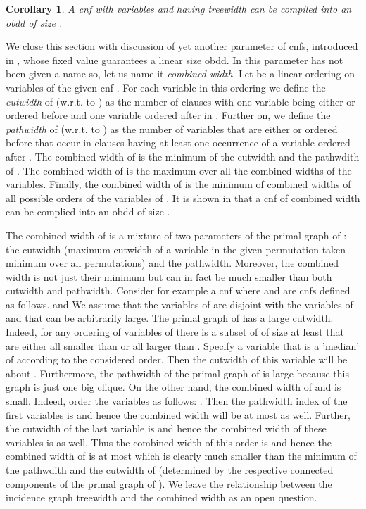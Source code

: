 \documentclass{article}
\newtheorem{corollary}{Corollary}
\begin{document}
\begin{corollary}
A {\sc cnf} with  variables and having treewidth  can be compiled into an {\sc obdd}
of size .
\end{corollary}

We close this section with discussion of yet another parameter of {\sc cnf}s, introduced in \cite{HuDar}, 
whose fixed value guarantees a linear size {\sc obdd}. 
In \cite{HuDar} this parameter has not been given a name so, let us name it \emph{combined width}.
Let  be a linear ordering on variables of
the given {\sc cnf} . For each variable  in this ordering we define the \emph{cutwidth} of  (w.r.t. to )
as the number of clauses with one variable being either  or ordered before  and one variable ordered after  in . 
Further on, we define the \emph{pathwidth} of  (w.r.t. to ) as the number of variables that are either  or ordered
before  that occur in clauses having at least one occurrence of a variable ordered after . 
The combined width of  is the minimum of the cutwidth and the pathwdith of . The combined width
of  is the maximum over all the combined widths of the variables. Finally, the combined width of  
is the minimum of combined widths of all possible orders of the variables of . It is shown in \cite{HuDar}
that a {\sc cnf} of combined width  can be complied into an {\sc obdd} of size . 

The combined width of  is a mixture of two parameters of the primal graph of : the cutwidth
(maximum cutwidth of a variable in the given permutation taken minimum over all permutations)
and the pathwidth. Moreover, the combined width is not just their minimum but can in fact be 
much smaller than both cutwidth and pathwidth. Consider for example a {\sc cnf}
 where  and  are {\sc cnf}s defined as follows.
  and 
We assume that the variables of  are disjoint with the variables of  and that 
can be arbitrarily large. The primal graph of  has a large cutwidth. Indeed, for any ordering
of variables of  there is a subset  of  of size at least  that are
either all smaller than  or all larger than . Specify a variable  that is a 'median' of 
according to the considered order. Then the cutwidth of this variable will be about .
Furthermore, the pathwidth of the primal graph of  is large because this graph is just one big clique.
On the other hand, the combined width of  and  is small. Indeed, order the variables as follows:
. Then the pathwidth index of the first  variables is  and hence
the combined width will be at most  as well. Further, the cutwidth of the last  variable is  and hence
the combined width of these variables is  as well. Thus the combined width of this order is  and hence
the combined width of  is at most  which is clearly much smaller than the minimum of the 
pathwdith and the cutwidth of  (determined by the respective connected components of the primal graph 
of ). We leave the relationship between the incidence graph treewidth and the combined width as an open question. 
\end{document}
